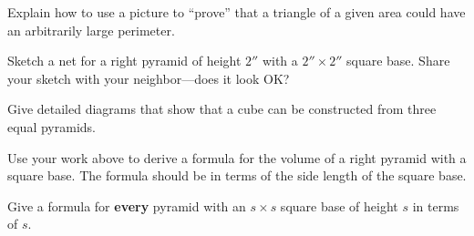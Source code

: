 \begin{prob}
Explain how to use a picture to ``prove'' that a triangle of a given
  area could have an arbitrarily large perimeter.
\end{prob}



\begin{prob}
Sketch a net for a right pyramid of height $2''$ with a $2'' \times
2''$ square base. Share your sketch with your neighbor---does it look
OK?
\end{prob}


\begin{prob}
Give detailed diagrams that show that a cube can be constructed from
three equal pyramids.
\end{prob}

\begin{prob}
Use your work above to derive a formula for the volume of a
right pyramid with a square base. The formula should be in terms of
the side length of the square base.
\end{prob}

\begin{prob}
Give a formula for \textbf{every} pyramid with an $s\times s$ square base of height $s$ in terms of $s$. 
\end{prob}



